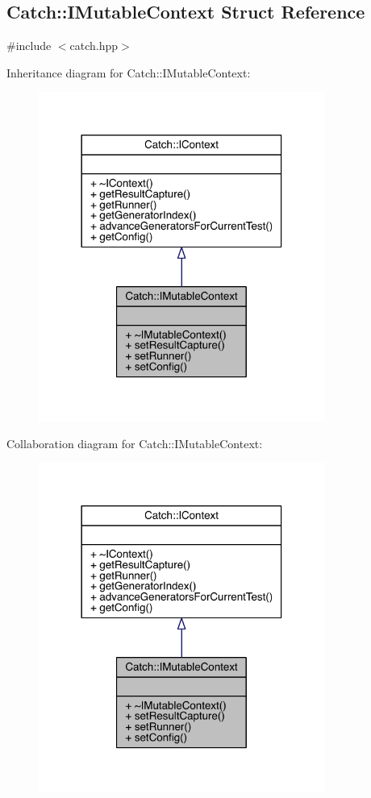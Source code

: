 \hypertarget{a00037}{}\subsection{Catch\+:\+:I\+Mutable\+Context Struct Reference}
\label{a00037}


{\ttfamily \#include $<$catch.\+hpp$>$}



Inheritance diagram for Catch\+:\+:I\+Mutable\+Context\+:\nopagebreak
\begin{figure}[H]
\begin{center}
\leavevmode
\includegraphics[width=266pt]{a00207}
\end{center}
\end{figure}


Collaboration diagram for Catch\+:\+:I\+Mutable\+Context\+:\nopagebreak
\begin{figure}[H]
\begin{center}
\leavevmode
\includegraphics[width=266pt]{a00208}
\end{center}
\end{figure}
